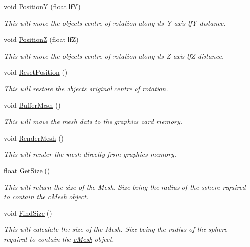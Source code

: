 \begin{DoxyCompactItemize}
void \hyperlink{classc_mesh_a031dd39f3c8aa1643a978b42bfc68ddc}{PositionY} (float lfY)
\begin{DoxyCompactList}\small\item\em This will move the objects centre of rotation along its Y axis lfY distance. \item\end{DoxyCompactList}\item 
void \hyperlink{classc_mesh_a75062dccdd861877dd206f81ac2f9ec0}{PositionZ} (float lfZ)
\begin{DoxyCompactList}\small\item\em This will move the objects centre of rotation along its Z axis lfZ distance. \item\end{DoxyCompactList}\item 
void \hyperlink{classc_mesh_a6b4d72718fa9a90fae3ee30dbe5f2575}{ResetPosition} ()
\begin{DoxyCompactList}\small\item\em This will restore the objects original centre of rotation. \item\end{DoxyCompactList}\item 
void \hyperlink{classc_mesh_a0dcd88ab580fcd6a67edb1d2decfffd9}{BufferMesh} ()
\begin{DoxyCompactList}\small\item\em This will move the mesh data to the graphics card memory. \item\end{DoxyCompactList}\item 
void \hyperlink{classc_mesh_aebed7b4b906c1ca62ea594c48eb803cf}{RenderMesh} ()
\begin{DoxyCompactList}\small\item\em This will render the mesh directly from graphics memory. \item\end{DoxyCompactList}\item 
float \hyperlink{classc_mesh_a93bdde998cfebc274b7573444dc98d34}{GetSize} ()
\begin{DoxyCompactList}\small\item\em This will return the size of the Mesh. Size being the radius of the sphere required to contain the \hyperlink{classc_mesh}{cMesh} object. \item\end{DoxyCompactList}\item 
void \hyperlink{classc_mesh_abaa10891ab82ca5988bb255fda7cfdae}{FindSize} ()
\begin{DoxyCompactList}\small\item\em This will calculate the size of the Mesh. Size being the radius of the sphere required to contain the \hyperlink{classc_mesh}{cMesh} object. \item\end{DoxyCompactList}\end{DoxyCompactItemize}
